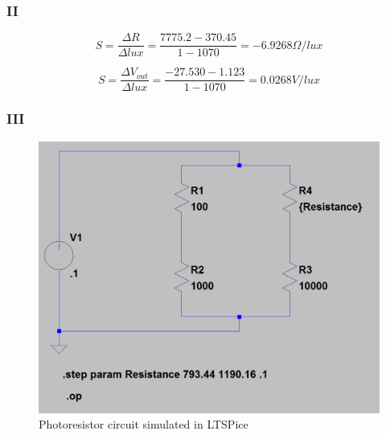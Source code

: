 \documentclass[10pt]{article}
\begin{document}
\subsubsection*{II}
\[S = \frac{\Delta R}{\Delta lux} = \frac{7775.2-370.45}{1-1070} = -6.9268\Omega/lux\]

\[S = \frac{\Delta V_{out}}{\Delta lux} = \frac{-27.530-1.123}{1-1070} = 0.0268V/lux\]

\subsubsection*{III}
\begin{figure}[H]
	\centering
	\includegraphics[width=\textwidth]{3}
	\caption{Photoresistor circuit simulated in LTSPice}
\end{figure}
\end{document}
